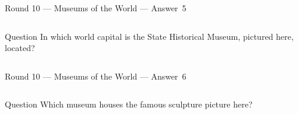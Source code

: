 \documentclass[11pt]{beamer}
\begin{document}
\begin{frame}[t]{Round 10 --- Museums of the World --- \mbox{Answer 5}}
\vspace{-0.5em}
\begin{columns}[T,totalwidth=\linewidth]
\begin{column}{0.32\linewidth}
\begin{block}{Question}
In which world capital is the State Historical Museum, pictured here, located?
\end{block}
\end{column}
\begin{column}{0.65\linewidth}
\begin{center}
\texttt{[image: \{Images/muzyey]}.jpg}
\end{center}
\end{column}
\end{columns}
\end{frame}
\begin{frame}[t]{Round 10 --- Museums of the World --- \mbox{Answer 6}}
\vspace{-0.5em}
\begin{columns}[T,totalwidth=\linewidth]
\begin{column}{0.32\linewidth}
\begin{block}{Question}
Which museum houses the famous sculpture picture here?
\end{block}
\end{column}
\begin{column}{0.65\linewidth}
\begin{center}
\texttt{[image: \{Images/venusdemilo]}.jpg}
\end{center}
\end{column}
\end{columns}
\end{frame}
\end{document}
